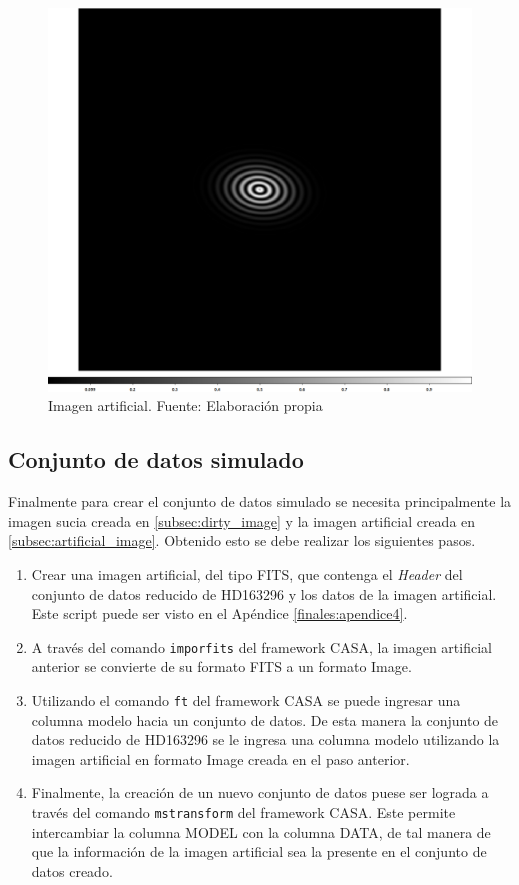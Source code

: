 \begin{figure}[!ht]
	\centering
	\captionsetup{justification=centering}
	\includegraphics[scale=0.35]{images/simulated_image.png}
	\caption[Imagen artificial]{Imagen artificial. Fuente: Elaboración propia}
	\label{fig:simulated_image}
\end{figure}

\subsection{Conjunto de datos simulado}

Finalmente para crear el conjunto de datos simulado se necesita principalmente la imagen sucia creada en \ref{subsec:dirty_image} y la imagen artificial creada en \ref{subsec:artificial_image}. Obtenido esto se debe realizar los siguientes pasos. 

\begin{enumerate}
    \item Crear una imagen artificial, del tipo FITS, que contenga el \textit{Header} del conjunto de datos reducido de HD163296 y los datos de la imagen artificial. Este script puede ser visto en el Apéndice \ref{finales:apendice4}. 
    \item A través del comando \texttt{imporfits} del framework CASA, la imagen artificial anterior se convierte de su formato FITS a un formato Image. 
    \item Utilizando el comando \texttt{ft} del framework CASA se puede ingresar una columna modelo hacia un conjunto de datos. De esta manera la conjunto de datos reducido de HD163296 se le ingresa una columna modelo utilizando la imagen artificial en formato Image creada en el paso anterior. 
    \item Finalmente, la creación de un nuevo conjunto de datos puese ser lograda a través del comando \texttt{mstransform} del framework CASA. Este permite intercambiar la columna MODEL con la columna DATA, de tal manera de que la información de la imagen artificial sea la presente en el conjunto de datos creado. 
\end{enumerate}

